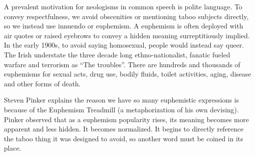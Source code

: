 
A prevalent motivation for neologisms in common speech is polite language. To convey respectfulness, we avoid obscenities or mentioning taboo subjects directly, so we instead use innuendo or euphemism. A euphemism is often deployed with air quotes or raised eyebrows to convey a hidden meaning surreptitiously implied. In the early 1900s, to avoid saying homosexual, people would instead say queer. The Irish understate the three decade long ethno-nationalist, fanatic fueled warfare and terrorism as ``The troubles''. There are hundreds and thousands of euphemisms for sexual acts, drug use, bodily fluids, toilet activities, aging, disease and other forms of death. 

Steven Pinker explains the reason we have so many euphemistic expressions is because of the Euphemism Treadmill (a metaphorization of his own devising). Pinker observed that as a euphemism popularity rises, its meaning becomes more apparent and less hidden. It becomes normalized. It begins to directly reference the taboo thing it was designed to avoid, so another word must be coined in its place.







